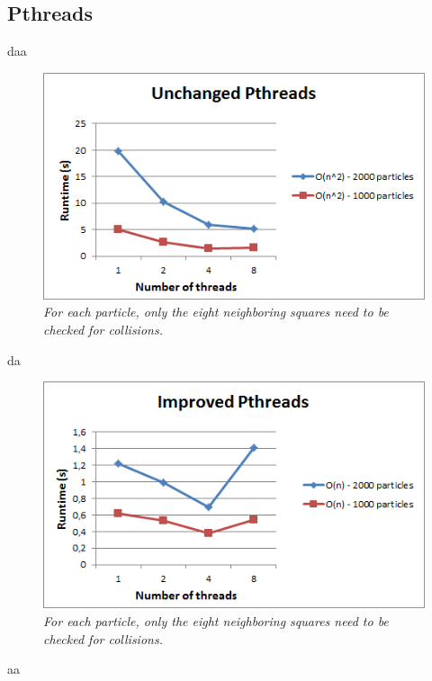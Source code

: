 \documentclass[11pt,a4paper]{article}
\begin{document}
\subsection{Pthreads}
daa
\begin{figure}[htb]
\centering
\includegraphics[scale=0.8]{pics/pth1.png}
\caption{\emph{For each particle, only the eight neighboring squares need to be checked for collisions.}}
\label{fig:gird}
\end{figure}
da
\begin{figure}[htb]
\centering
\includegraphics[scale=0.8]{pics/pth2.png}
\caption{\emph{For each particle, only the eight neighboring squares need to be checked for collisions.}}
\label{fig:gird}
\end{figure}
aa
\end{document}
